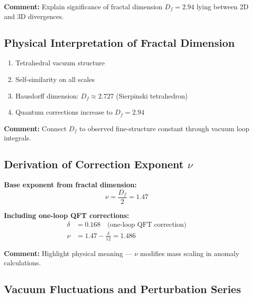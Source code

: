 \documentclass[12pt,a4paper]{article}
\newcommand{\nulep}{\nu}            %
\begin{document}
\textbf{Comment:} Explain significance of fractal dimension $D_f = 2.94$ lying between 2D and 3D divergences.

\subsection{Physical Interpretation of Fractal Dimension}

\begin{enumerate}
	\item Tetrahedral vacuum structure
	\item Self-similarity on all scales
	\item Hausdorff dimension: $D_f \approx 2.727$ (Sierpinski tetrahedron)
	\item Quantum corrections increase to $D_f = 2.94$
\end{enumerate}

\textbf{Comment:} Connect $D_f$ to observed fine-structure constant through vacuum loop integrals.

\subsection{Derivation of Correction Exponent $\nulep$}

\textbf{Base exponent from fractal dimension:}
\begin{equation}
	\nulep = \frac{D_f}{2} = 1.47
\end{equation}

\textbf{Including one-loop QFT corrections:}
\begin{align}
	\delta &= 0.168 \quad \text{(one-loop QFT correction)} \\
	\nulep &= 1.47 - \frac{\delta}{12} = 1.486
\end{align}

\textbf{Comment:} Highlight physical meaning — $\nulep$ modifies mass scaling in anomaly calculations.

\subsection{Vacuum Fluctuations and Perturbation Series}
\end{document}

